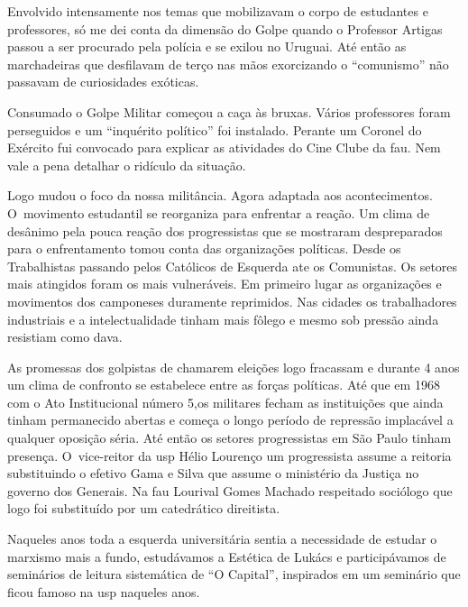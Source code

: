 Envolvido intensamente nos temas que mobilizavam o corpo de estudantes e
professores, só me dei conta da dimensão do Golpe quando o Professor
Artigas passou a ser procurado pela polícia e se exilou no Uruguai. Até
então as marchadeiras que desfilavam de terço nas mãos exorcizando o
“comunismo” não passavam de curiosidades exóticas.

\subject{O Golpe}

Consumado o Golpe Militar começou a caça às bruxas. Vários professores
foram perseguidos e um “inquérito político” foi instalado. Perante um
Coronel do Exército fui convocado para explicar as atividades do Cine
Clube da {\sc fau}. Nem vale a pena detalhar o ridículo da situação.

Logo mudou o foco da nossa militância. Agora adaptada aos
acontecimentos. O~movimento estudantil se reorganiza para enfrentar a
reação. Um clima de desânimo pela pouca reação dos progressistas que se
mostraram despreparados para o enfrentamento tomou conta das
organizações políticas. Desde os Trabalhistas passando pelos Católicos
de Esquerda ate os Comunistas. Os setores mais atingidos foram os mais
vulneráveis. Em primeiro lugar as organizações e movimentos dos
camponeses duramente reprimidos. Nas cidades os trabalhadores
industriais e a intelectualidade tinham mais fôlego e mesmo sob pressão
ainda resistiam como dava.

As promessas dos golpistas de chamarem eleições logo fracassam e durante
4 anos um clima de confronto se estabelece entre as forças políticas.
Até que em 1968 com o Ato Institucional número 5,os militares fecham as
instituições que ainda tinham permanecido abertas e começa o longo
período de repressão implacável a qualquer oposição séria. Até então os
setores progressistas em São Paulo tinham presença. O~vice-reitor da {\sc usp}
Hélio Lourenço um progressista assume a reitoria substituindo o efetivo
Gama e Silva que assume o ministério da Justiça no governo dos Generais.
Na {\sc fau} Lourival Gomes Machado respeitado sociólogo que logo foi
substituído por um catedrático direitista.

Naqueles anos toda a esquerda universitária sentia a necessidade de
estudar o marxismo mais a fundo, estudávamos a Estética de Lukács e
participávamos de seminários de leitura sistemática de “O Capital”,
inspirados em um seminário que ficou famoso na {\sc usp} naqueles anos.

